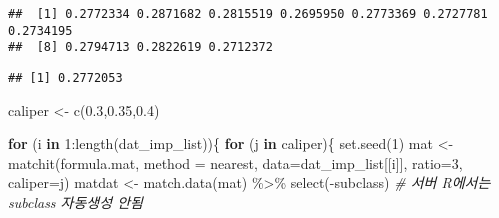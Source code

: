 \documentclass[
]{book}
\newenvironment{Shaded}{\begin{snugshade}}{\end{snugshade}}
\newcommand{\AttributeTok}[1]{\textcolor[rgb]{0.77,0.63,0.00}{#1}}
\newcommand{\CommentTok}[1]{\textcolor[rgb]{0.56,0.35,0.01}{\textit{#1}}}
\newcommand{\ControlFlowTok}[1]{\textcolor[rgb]{0.13,0.29,0.53}{\textbf{#1}}}
\newcommand{\DecValTok}[1]{\textcolor[rgb]{0.00,0.00,0.81}{#1}}
\newcommand{\FloatTok}[1]{\textcolor[rgb]{0.00,0.00,0.81}{#1}}
\newcommand{\FunctionTok}[1]{\textcolor[rgb]{0.00,0.00,0.00}{#1}}
\newcommand{\NormalTok}[1]{#1}
\newcommand{\OtherTok}[1]{\textcolor[rgb]{0.56,0.35,0.01}{#1}}
\newcommand{\SpecialCharTok}[1]{\textcolor[rgb]{0.00,0.00,0.00}{#1}}
\newcommand{\StringTok}[1]{\textcolor[rgb]{0.31,0.60,0.02}{#1}}
\begin{document}
\begin{verbatim}
##  [1] 0.2772334 0.2871682 0.2815519 0.2695950 0.2773369 0.2727781 0.2734195
##  [8] 0.2794713 0.2822619 0.2712372
\end{verbatim}

\begin{verbatim}
## [1] 0.2772053
\end{verbatim}

\begin{Shaded}
\begin{Highlighting}[]
\NormalTok{caliper }\OtherTok{\textless{}{-}} \FunctionTok{c}\NormalTok{(}\FloatTok{0.3}\NormalTok{,}\FloatTok{0.35}\NormalTok{,}\FloatTok{0.4}\NormalTok{)}

\ControlFlowTok{for}\NormalTok{ (i }\ControlFlowTok{in} \DecValTok{1}\SpecialCharTok{:}\FunctionTok{length}\NormalTok{(dat\_imp\_list))\{}
  \ControlFlowTok{for}\NormalTok{ (j }\ControlFlowTok{in}\NormalTok{ caliper)\{}
    \FunctionTok{set.seed}\NormalTok{(}\DecValTok{1}\NormalTok{)}
\NormalTok{    mat }\OtherTok{\textless{}{-}} \FunctionTok{matchit}\NormalTok{(formula.mat, }\AttributeTok{method =} \StringTok{\textquotesingle{}nearest\textquotesingle{}}\NormalTok{, }\AttributeTok{data=}\NormalTok{dat\_imp\_list[[i]], }\AttributeTok{ratio=}\DecValTok{3}\NormalTok{, }\AttributeTok{caliper=}\NormalTok{j)}
\NormalTok{    matdat }\OtherTok{\textless{}{-}} \FunctionTok{match.data}\NormalTok{(mat) }\SpecialCharTok{\%\textgreater{}\%} \FunctionTok{select}\NormalTok{(}\SpecialCharTok{{-}}\NormalTok{subclass) }\CommentTok{\# 서버 R에서는 subclass 자동생성 안됨}
    

\end{Highlighting}
\end{Shaded}
\end{document}
